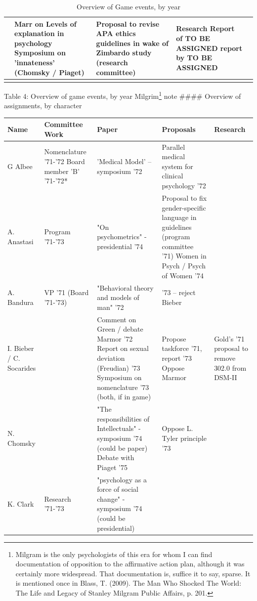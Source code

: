 \begin{refsection}
\begin{longtable}[!t]{ | p{2cm} | p{2cm} | p{2cm} |p{2cm} | p{6cm} |  }
&

Marr on Levels of explanation in psychology \newline
Symposium on 'innateness' (Chomsky / Piaget)&
Proposal to revise APA ethics guidelines in wake of Zimbardo study (research committee)&
Research Report of TO BE ASSIGNED report by TO BE ASSIGNED\\
\hline
\caption{Overview of Game events, by year}
\label{table: overviewbyyear}
\end{longtable}


Table 4: Overview of game events, by year
 Milgrim\footnote{Milgram is the only psychologists of this era for whom I can find documentation of opposition to the affirmative action plan, although it was certainly more widespread. That documentation is, suffice it to say, sparse. It is mentioned once in Blass, T. (2009). The Man Who Shocked The World: The Life and Legacy of Stanley Milgram Public Affairs, p. 201.} note
 \#\#\#\# Overview of assignments, by character
 \begin{longtable}[!t]{ | p{1cm} | p{2cm} | p{6cm} |  p{3cm} |  p{3cm} | }
\hline
Name&
Committee Work&
Paper&
Proposals&
Research\\ \hline
G Albee&
Nomenclature '71-'72 \newline
Board member 'B' '71-'72*&
'Medical Model' – symposium '72&
Parallel medical system for clinical psychology '72&
\\
A. Anastasi&
Program '71-'73&
"On psychometrics" - presidential '74&
Proposal to fix gender-specific language in guidelines (program committee '71)
Women in Psych / Psych of Women '74&
\\
A. Bandura&
VP '71\newline
(Board '71-'73)&
"Behavioral theory and models of man" '72&
'73 – reject Bieber&
\\
I. Bieber /
C. Socarides&
&
Comment on Green / debate Marmor '72\newline
Report on sexual deviation (Freudian) '73
Symposium on nomenclature '73 (both, if in game)&
Propose taskforce '71, report '73\newline
Oppose Marmor & Gold's '71 proposal to remove 302.0 from DSM-II\\
N. Chomsky&
&
"The responsibilities of Intellectuals" - symposium '74 (could be paper)\newline
Debate with Piaget '75&
Oppose L. Tyler principle '73&
\\
K. Clark&
Research '71-'73&
"psychology as a force of social change" - symposium '74 (could be presidential)&

\end{longtable}
\end{refsection}
